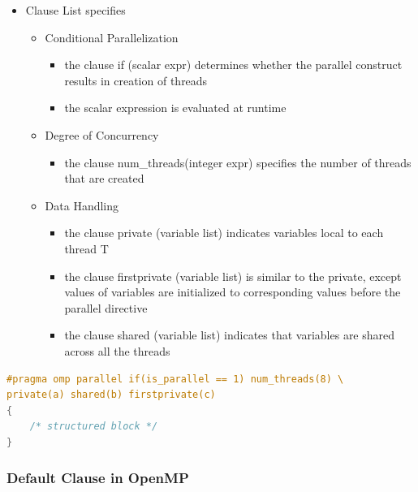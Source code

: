 \begin{itemize}
\tightlist
\item
  Clause List specifies

  \begin{itemize}
  \tightlist
  \item
    Conditional Parallelization

    \begin{itemize}
    \tightlist
    \item
      the clause if (scalar expr) determines whether the parallel
      construct results in creation of threads
    \item
      the scalar expression is evaluated at runtime
    \end{itemize}
  \item
    Degree of Concurrency

    \begin{itemize}
    \tightlist
    \item
      the clause num\_threads(integer expr) specifies the number of
      threads that are created
    \end{itemize}
  \item
    Data Handling

    \begin{itemize}
    \tightlist
    \item
      the clause private (variable list) indicates variables local to
      each thread T
    \item
      the clause firstprivate (variable list) is similar to the private,
      except values of variables are initialized to corresponding values
      before the parallel directive
    \item
      the clause shared (variable list) indicates that variables are
      shared across all the threads
    \end{itemize}
  \end{itemize}
\end{itemize}

\begin{lstlisting}[language=C++]
#pragma omp parallel if(is_parallel == 1) num_threads(8) \
private(a) shared(b) firstprivate(c)
{
    /* structured block */
}
\end{lstlisting}

\hypertarget{default-clause-in-openmp}{%
\subsubsection{Default Clause in
OpenMP}\label{default-clause-in-openmp}}

